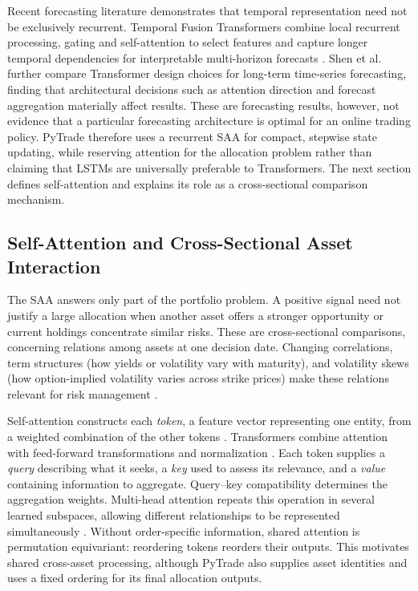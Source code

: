 Recent forecasting literature demonstrates that temporal representation need not be exclusively recurrent. Temporal Fusion Transformers combine local recurrent processing, gating and self-attention to select features and capture longer temporal dependencies for interpretable multi-horizon forecasts \cite{lim2020tft}. Shen et al. \cite{LefeiShen.2025} further compare Transformer design choices for long-term time-series forecasting, finding that architectural decisions such as attention direction and forecast aggregation materially affect results. These are forecasting results, however, not evidence that a particular forecasting architecture is optimal for an online trading policy. PyTrade therefore uses a recurrent SAA for compact, stepwise state updating, while reserving attention for the allocation problem rather than claiming that LSTMs are universally preferable to Transformers. The next section defines self-attention and explains its role as a cross-sectional comparison mechanism.

\subsection{Self-Attention and Cross-Sectional Asset Interaction}
\label{sec:self-attention}

The SAA answers only part of the portfolio problem. A positive signal need not justify a large allocation when another asset offers a stronger opportunity or current holdings concentrate similar risks. These are cross-sectional comparisons, concerning relations among assets at one decision date. Changing correlations, term structures (how yields or volatility vary with maturity), and volatility skews (how option-implied volatility varies across strike prices) make these relations relevant for risk management \cite{Bennett.2014}.

Self-attention constructs each \emph{token}, a feature vector representing one entity, from a weighted combination of the other tokens \cite{vaswani2017}. Transformers combine attention with feed-forward transformations and normalization \cite{manning2023_stanford}. Each token supplies a \emph{query} describing what it seeks, a \emph{key} used to assess its relevance, and a \emph{value} containing information to aggregate. Query--key compatibility determines the aggregation weights. Multi-head attention repeats this operation in several learned subspaces, allowing different relationships to be represented simultaneously \cite{vaswani2017}. Without order-specific information, shared attention is permutation equivariant: reordering tokens reorders their outputs. This motivates shared cross-asset processing, although PyTrade also supplies asset identities and uses a fixed ordering for its final allocation outputs.


